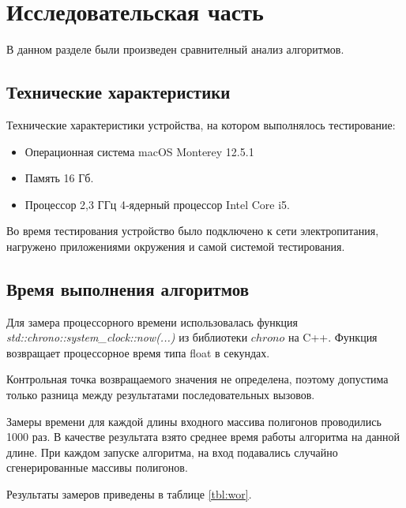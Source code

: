 \chapter{Исследовательская часть}

В данном разделе были произведен сравнителный анализ алгоритмов.

\section{Технические характеристики}

Технические характеристики устройства, на котором выполнялось тестирование:

\begin{itemize}
	\item Операционная система macOS Monterey 12.5.1 
	\item Память 16 Гб.
	\item Процессор 2,3 ГГц 4‑ядерный процессор Intel Core i5.
\end{itemize}

Во время тестирования устройство было подключено к сети электропитания, нагружено приложениями окружения и самой  системой тестирования.

\section{Время выполнения алгоритмов}

Для \hfill замера \hfill процессорного \hfill времени \hfill использовалась \hfill функция 
\\ \textit{std::chrono::system\_clock::now(...)} из библиотеки $chrono$ \cite{cpp-lang-chrono} на C++. Функция возвращает процессорное время типа float в секундах.

Контрольная точка возвращаемого значения не определена, поэтому допустима только разница между результатами последовательных вызовов.

Замеры времени для каждой длины входного массива полигонов проводились 1000 раз. В качестве результата взято среднее время работы алгоритма на данной длине. При каждом запуске алгоритма, на вход подавались случайно сгенерированные массивы полигонов. 

Результаты замеров приведены в таблице \ref{tbl:wor}.

